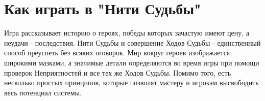 \section*{Как играть в "Нити Судьбы"}
Игра рассказывает историю о героях, победы которых зачастую имеют цену, а неудачи - последствия. Нити Судьбы и совершение Ходов Судьбы - единственный способ преуспеть без всяких оговорок. Мир вокруг героев изображается широкими мазками, а значимые детали определяются во время игры при помощи проверок Неприятностей и все тех же Ходов Судьбы. Помимо того, есть несколько простых принципов, которые позволят мастеру и игрокам высвободить весь потенциал системы.